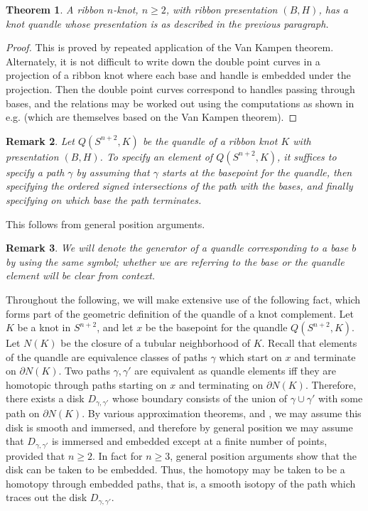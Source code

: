 \documentclass{amsart}
\newtheorem{theorem}{Theorem}
\newtheorem{remark}[theorem]{Remark}
\newcommand{\bpr}{\begin{proof}}
\newcommand{\epr}{\end{proof}}
\begin{document}
\begin{theorem}
A ribbon $n$-knot, $n\geq 2$, with ribbon presentation $(B, H)$, has a knot quandle whose presentation is as described in the previous paragraph.
\end{theorem}
\bpr
This is proved by repeated application of the Van Kampen theorem. Alternately, it is not difficult to write down the double point curves in a projection of a ribbon knot where each base and handle is embedded under the projection. Then the double point curves correspond to handles passing through bases, and the relations may be worked out using the computations as shown in e.g. \cite{CKS} (which are themselves based on the Van Kampen theorem).
\epr

\begin{remark}
Let $Q(S^{n+2}, K)$ be the quandle of a ribbon knot $K$ with presentation $(B, H)$. To specify an element of $Q(S^{n+2}, K)$, it suffices to specify a path $\gamma$ by assuming that $\gamma$ starts at the basepoint for the quandle, then specifying the ordered signed intersections of the path with the bases, and finally specifying on which base the path terminates.
\end{remark}

This follows from general position arguments.

\begin{remark}
We will denote the generator of a quandle corresponding to a base $b$ by using the same symbol; whether we are referring to the base or the quandle element will be clear from context.
\end{remark}

Throughout the following, we will make extensive use of the following fact, which forms part of the geometric definition of the quandle of a knot complement. Let $K$ be a knot in $S^{n+2}$, and let $x$ be the basepoint for the quandle $Q(S^{n+2}, K)$. Let $N(K)$ be the closure of a tubular neighborhood of $K$. Recall that elements of the quandle are equivalence classes of paths $\gamma$ which start on $x$ and terminate on $\partial N(K)$. Two paths $\gamma, \gamma'$ are equivalent as quandle elements iff they are homotopic through paths starting on $x$ and terminating on $\partial N(K)$. Therefore, there exists a disk $D_{\gamma, \gamma'}$ whose boundary consists of the union of $\gamma \cup \gamma'$ with some path on $\partial N(K)$. By various approximation theorems, \cite[Theorem 10.16, Theorem 10.21]{Lee} and \cite[Theorem 2.5]{Adachi}, we may assume this disk is smooth and immersed, and therefore by general position we may assume that $D_{\gamma, \gamma'}$ is immersed and embedded except at a finite number of points, provided that $n\geq 2$. In fact for $n\geq 3$, general position arguments show that the disk can be taken to be embedded. Thus, the homotopy may be taken to be a homotopy through embedded paths, that is, a smooth isotopy of the path which traces out the disk $D_{\gamma, \gamma'}$.
\end{document}
